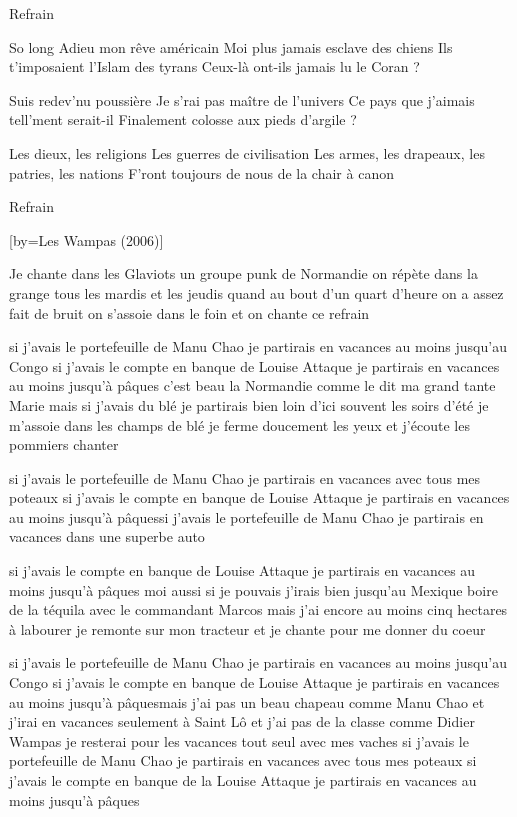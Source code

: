 \beginverse
Refrain
\endverse

\beginverse
So long \! Adieu mon rêve américain
Moi plus jamais esclave des chiens
Ils t’imposaient l’Islam des tyrans
Ceux-là ont-ils jamais lu le Coran ?
\endverse

\beginverse
Suis redev’nu poussière
Je s’rai pas maître de l’univers
Ce pays que j’aimais tell’ment serait-il
Finalement colosse aux pieds d’argile ?
\endverse

\beginverse
Les dieux, les religions
Les guerres de civilisation
Les armes, les drapeaux, les patries, les nations
F’ront toujours de nous de la chair à canon
\endverse

\beginverse
Refrain\\[bis]
\endverse

[by={Les Wampas (2006)}]

\beginverse
Je chante dans les Glaviots un groupe punk de Normandie
on répète dans la grange tous les mardis et les jeudis
quand au bout d'un quart d'heure on a assez fait de bruit
on s'assoie dans le foin et on chante ce refrain
\endverse

\beginverse
si j'avais le portefeuille de Manu Chao
je partirais en vacances au moins jusqu'au Congo
si j'avais le compte en banque de Louise Attaque
je partirais en vacances au moins jusqu'à pâques
c'est beau la Normandie comme le dit ma grand tante Marie
mais si j'avais du blé je partirais bien loin d'ici
souvent les soirs d'été je m'assoie dans les champs de blé
je ferme doucement les yeux et j'écoute les pommiers chanter
\endverse

\beginverse
si j'avais le portefeuille de Manu Chao
je partirais en vacances avec tous mes poteaux
si j'avais le compte en banque de Louise Attaque
je partirais en vacances au moins jusqu'à pâquessi j'avais le portefeuille de Manu Chao
je partirais en vacances dans une superbe auto
\endverse

\beginverse
si j'avais le compte en banque de Louise Attaque
je partirais en vacances au moins jusqu'à pâques
moi aussi si je pouvais j'irais bien jusqu'au Mexique
boire de la téquila avec le commandant Marcos
mais j'ai encore au moins cinq hectares à labourer
je remonte sur mon tracteur et je chante pour me donner du coeur
\endverse

\beginverse
si j'avais le portefeuille de Manu Chao
je partirais en vacances au moins jusqu'au Congo
si j'avais le compte en banque de Louise Attaque
je partirais en vacances au moins jusqu'à pâquesmais j'ai pas un beau chapeau comme Manu Chao
et j'irai en vacances seulement à Saint Lô
et j'ai pas de la classe comme Didier Wampas
je resterai pour les vacances
tout seul avec mes vaches si j'avais le portefeuille de Manu Chao
je partirais en vacances avec tous mes poteaux
si j'avais le compte en banque de la Louise Attaque
je partirais en vacances au moins jusqu'à pâques
\endverse

